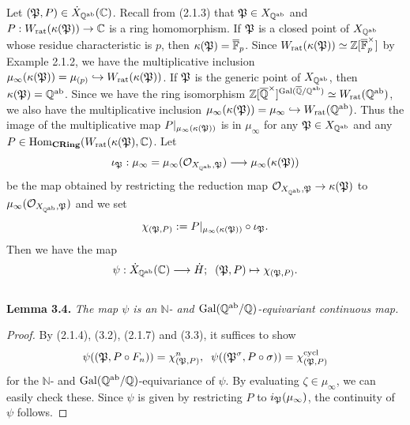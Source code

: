 \documentclass[12pt, leqno]{article}
\begin{document}
Let $(\frak{P}, P) \in \dot{X}_{\mathbb{Q}^{\rm ab}}(\mathbb{C})$. Recall from (2.1.3) that $\frak{P} \in X_{\mathbb{Q}^{\rm ab}}$ and $P : W_{\rm rat}(\kappa(\frak{P})) \rightarrow \mathbb{C}$ is a ring homomorphism. 
If $\frak{P}$ is a closed point of $X_{\mathbb{Q}^{\rm ab}}$ whose residue characteristic is $p$, then $\kappa(\frak{P}) = \overline{\mathbb{F}}_p$. Since $W_{\rm rat}(\kappa(\frak{P})) \simeq \mathbb{Z}[\overline{\mathbb{F}}_p^{\times}]$ by Example 2.1.2, we have the multiplicative inclusion $\mu_{\infty}(\kappa(\frak{P})) = \mu_{(p)} \hookrightarrow W_{\rm rat}(\kappa(\frak{P}))$. If $\frak{P}$ is the generic point of  $X_{\mathbb{Q}^{\rm ab}}$, then $\kappa(\frak{P}) = \mathbb{Q}^{\rm ab}$.  Since we have the ring isomorphism $ \mathbb{Z}[\overline{\mathbb{Q}}^{\times}]^{{\rm Gal}(\overline{\mathbb{Q}}/\mathbb{Q}^{\rm ab})} \simeq W_{\rm rat}(\mathbb{Q}^{\rm ab})$, we also have the multiplicative inclusion $\mu_{\infty}(\kappa(\frak{P})) = \mu_{\infty} \hookrightarrow W_{\rm rat}(\mathbb{Q}^{\rm ab})$. Thus the image of the multiplicative map $P|_{\mu_{\infty}(\kappa(\frak{P}))}$ is in $\mu_{\infty}$ for any $\frak{P} \in X_{\mathbb{Q}^{\rm ab}}$ and any $P \in {\rm Hom}_{\bf CRing}(W_{\rm rat}(\kappa(\frak{P}), \mathbb{C})$.  Let  
$$\iota_{\frak{P}} : \mu_{\infty}  = \mu_{\infty}({\cal O}_{X_{\mathbb{Q}^{\rm ab}}, \frak{P}}) \longrightarrow \mu_{\infty}(\kappa(\frak{P}))$$
be the map obtained by restricting  the reduction map ${\cal O}_{X_{\mathbb{Q}^{\rm ab}}, \frak{P}} \rightarrow \kappa(\frak{P})$
to $\mu_{\infty}({\cal O}_{X_{\mathbb{Q}^{\rm ab}}, \frak{P}} )$ and we set 
$$ \chi_{(\frak{P}, P)} := P|_{\mu_{\infty}(\kappa(\frak{P}))} \circ \iota_{\frak{P}}.$$
Then we have the map
$$ \psi : \dot{X}_{\mathbb{Q}^{\rm ab}}(\mathbb{C}) \longrightarrow \dot{H}; \;\; (\frak{P}, P) \mapsto \chi_{(\frak{P}, P)}.$$
\vspace{0.02cm}\\
{\bf Lemma 3.4.} {\it The map $\psi$ is an $\mathbb{N}$- and ${\rm Gal}(\mathbb{Q}^{\rm ab}/\mathbb{Q})$-equivariant continuous map.}
\begin{proof}
 By (2.1.4), (3.2), (2.1.7) and (3.3), it suffices to show
$$ \psi((\frak{P}, P \circ F_n)) = \chi_{(\frak{P},P)}^n, \;\; \psi((\frak{P}^{\sigma}, P \circ \sigma)) = \chi_{(\frak{P}, P)}^{\rm cycl} $$
for the $\mathbb{N}$- and ${\rm Gal}(\mathbb{Q}^{\rm ab}/\mathbb{Q})$-equivariance of $\psi$.  By evaluating $\zeta \in \mu_{\infty}$, we can easily check these. Since $\psi$ is given by restricting $P$ to $i_{\frak{P}}(\mu_{\infty})$, the continuity of $\psi$ follows. 
\end{proof} 
\end{document}
